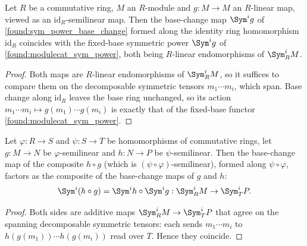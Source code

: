 \begin{lemma}\leanok
  \label{found:sym_base_change_map_id}
  Let \(R\) be a commutative ring, \(M\) an \(R\)-module and \(g:M\to M\) an
  \(R\)-linear map, viewed as an \(\mathrm{id}_R\)-semilinear map.  Then the
  base-change map \(\Sym^i g\) of \cref{found:sym_power_base_change} formed along
  the identity ring homomorphism \(\mathrm{id}_R\) coincides with the fixed-base
  symmetric power \(\Sym^i g\) of \cref{found:modulecat_sym_power}, both being
  \(R\)-linear endomorphisms of \(\Sym^i_R M\).
\end{lemma}

\begin{proof}\leanok
  Both maps are \(R\)-linear endomorphisms of \(\Sym^i_R M\), so it suffices to
  compare them on the decomposable symmetric tensors \(m_1\cdots m_i\), which span.
  Base change along \(\mathrm{id}_R\) leaves the base ring unchanged, so its action
  \(m_1\cdots m_i\mapsto g(m_1)\cdots g(m_i)\) is exactly that of the fixed-base
  functor \cref{found:modulecat_sym_power}.
\end{proof}

\begin{lemma}\leanok
  \label{found:sym_base_change_map_comp}
  Let \(\varphi:R\to S\) and \(\psi:S\to T\) be homomorphisms of commutative rings,
  let \(g:M\to N\) be \(\varphi\)-semilinear and \(h:N\to P\) be
  \(\psi\)-semilinear.  Then the base-change map of the composite \(h\circ g\)
  (which is \((\psi\circ\varphi)\)-semilinear), formed along \(\psi\circ\varphi\),
  factors as the composite of the base-change maps of \(g\) and \(h\):
  \[
    \Sym^i(h\circ g)=\Sym^i h\circ\Sym^i g
    :\Sym^i_R M\to\Sym^i_T P .
  \]
\end{lemma}

\begin{proof}\leanok
  Both sides are additive maps \(\Sym^i_R M\to\Sym^i_T P\) that agree on the
  spanning decomposable symmetric tensors: each sends \(m_1\cdots m_i\) to
  \(h(g(m_1))\cdots h(g(m_i))\) read over \(T\).  Hence they coincide.
\end{proof}

